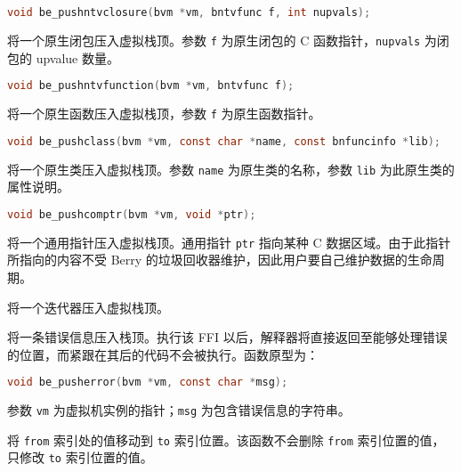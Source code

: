 
\begin{lstlisting}[language=c, style=berry, numbers=none]
void be_pushntvclosure(bvm *vm, bntvfunc f, int nupvals);
\end{lstlisting}

将一个原生闭包压入虚拟栈顶。参数 \texttt{f} 为原生闭包的 C 函数指针，\texttt{nupvals} 为闭包的 upvalue 数量。


\begin{lstlisting}[language=c, style=berry, numbers=none]
void be_pushntvfunction(bvm *vm, bntvfunc f);
\end{lstlisting}

将一个原生函数压入虚拟栈顶，参数 \texttt{f} 为原生函数指针。


\begin{lstlisting}[language=c, style=berry, numbers=none]
void be_pushclass(bvm *vm, const char *name, const bnfuncinfo *lib);
\end{lstlisting}

将一个原生类压入虚拟栈顶。参数 \texttt{name} 为原生类的名称，参数 \texttt{lib} 为此原生类的属性说明。


\begin{lstlisting}[language=c, style=berry, numbers=none]
void be_pushcomptr(bvm *vm, void *ptr);
\end{lstlisting}

将一个通用指针压入虚拟栈顶。通用指针 \texttt{ptr} 指向某种 C 数据区域。由于此指针所指向的内容不受 Berry 的垃圾回收器维护，因此用户要自己维护数据的生命周期。


将一个迭代器压入虚拟栈顶。


将一条错误信息压入栈顶。执行该 FFI 以后，解释器将直接返回至能够处理错误的位置，而紧跟在其后的代码不会被执行。函数原型为：
\begin{lstlisting}[language=c, style=berry, numbers=none]
void be_pusherror(bvm *vm, const char *msg);
\end{lstlisting}
参数 \texttt{vm} 为虚拟机实例的指针；\texttt{msg} 为包含错误信息的字符串。


将 \texttt{from} 索引处的值移动到 \texttt{to} 索引位置。该函数不会删除 \texttt{from} 索引位置的值，只修改 \texttt{to} 索引位置的值。

